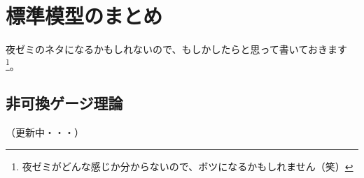 \documentclass[unicode,a4paper,11pt]{ltjsarticle}
\renewcommand{\theequation}{\thesection.\arabic{equation}}
\renewcommand{\thefigure}{\thesection.\arabic{figure}}
\renewcommand{\thetable}{\thesection.\arabic{table}}
\begin{document}

\clearpage
\makeatletter
\renewcommand{\appendix}{\par
   \setcounter{section}{0}%
   \setcounter{subsection}{0}%
   \gdef\presectionname{\appendixname}%
   \gdef\postsectionname{}%
   \gdef\thesection{\presectionname\@Alph\c@section\postsectionname}%
   \gdef\thesubsection{\@Alph\c@section.\@arabic\c@subsection}%
   \renewcommand{\theequation}{\@Alph\c@section.\arabic{equation}}%
   \renewcommand{\thefigure}{\@Alph\c@section.\arabic{figure}}%
   \renewcommand{\thetable}{\@Alph\c@section.\arabic{table}}%
}
\makeatother
\appendix


\section{標準模型のまとめ}

夜ゼミのネタになるかもしれないので、もしかしたらと思って書いておきます\footnote{
   夜ゼミがどんな感じか分からないので、ボツになるかもしれません（笑）
}。

\subsection{非可換ゲージ理論}

（更新中・・・）












\clearpage



\nocite{Peskin:1995}
\nocite{Fujii:2005}
\end{document}
